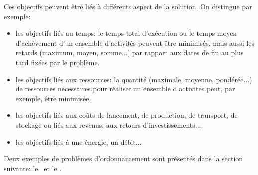 Ces objectifs peuvent être liés à différents aspect de la solution. On
distingue par exemple:
\begin{itemize}
\item les objectifs liés au temps: le temps total d'exécution ou le temps moyen
  d'achèvement d'un ensemble d'activités peuvent être minimisés, mais
  aussi  les retards (maximum, moyen, somme...) par rapport
  aux dates de fin au plus tard fixées par le problème.
\item les objectifs liés aux ressources: la quantité (maximale,
  moyenne, pondérée...) de ressources nécessaires pour réaliser un
  ensemble d'activités peut, par exemple, être minimisée.
\item les objectifs liés aux coûts de lancement, de production, de
  transport, de stockage ou liés aux revenus, aux retours
  d'investissements... 
\item les objectifs liés à une énergie, un débit...
\end{itemize}

Deux exemples de problèmes d'ordonnancement sont présentés dans la
section suivante: le \RCPSP~et le \CUSP.